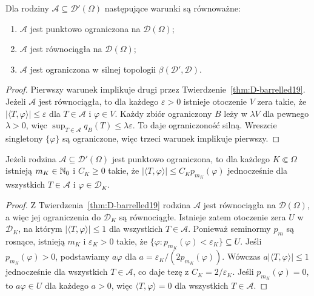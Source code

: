 \begin{wniosek}
\label{cor:bounded-distributions19}
Dla rodziny $\mathcal A\subseteq\mathcal D'(\Omega)$
następujące warunki są równoważne:
\begin{enumerate}
\item $\mathcal A$ jest punktowo ograniczona na $\mathcal D(\Omega)$;
\item $\mathcal A$ jest równociągła na $\mathcal D(\Omega)$;
\item $\mathcal A$ jest ograniczona w silnej topologii
$\beta(\mathcal D',\mathcal D)$.
\end{enumerate}
\end{wniosek}
\begin{proof}
Pierwszy warunek implikuje drugi przez
Twierdzenie~\ref{thm:D-barrelled19}. Jeżeli
$\mathcal A$ jest równociągła, to dla każdego
$\varepsilon>0$ istnieje otoczenie $V$ zera takie,
że $|\langle T,\varphi\rangle|\le\varepsilon$ dla
$T\in\mathcal A$ i $\varphi\in V$.
Każdy zbiór ograniczony $B$ leży w $\lambda V$
dla pewnego $\lambda>0$, więc
$\sup_{T\in\mathcal A}q_B(T)\le\lambda\varepsilon$.
To daje ograniczoność silną. Wreszcie singletony
$\{\varphi\}$ są ograniczone, więc trzeci warunek
implikuje pierwszy.
\end{proof}

\begin{wniosek}
\label{cor:uniform-order19}
Jeżeli rodzina $\mathcal A\subseteq\mathcal D'(\Omega)$ jest
punktowo ograniczona, to dla każdego $K\Subset\Omega$
istnieją $m_K\in\mathbb N_0$ i $C_K\ge0$ takie, że
$|\langle T,\varphi\rangle|\le C_Kp_{m_K}(\varphi)$
jednocześnie dla wszystkich $T\in\mathcal A$
i $\varphi\in\mathcal D_K$.
\end{wniosek}
\begin{proof}
Z Twierdzenia~\ref{thm:D-barrelled19} rodzina $\mathcal A$
jest równociągła na $\mathcal D(\Omega)$, a więc jej
ograniczenia do $\mathcal D_K$ są równociągłe.
Istnieje zatem otoczenie zera $U$ w $\mathcal D_K$,
na którym $|\langle T,\varphi\rangle|\le1$ dla wszystkich
$T\in\mathcal A$. Ponieważ seminormy $p_m$ są rosnące,
istnieją $m_K$ i $\varepsilon_K>0$ takie, że
$\{\varphi:p_{m_K}(\varphi)<\varepsilon_K\}\subseteq U$.
Jeśli $p_{m_K}(\varphi)>0$, podstawiamy
$a\varphi$ dla $a=\varepsilon_K/(2p_{m_K}(\varphi))$.
Wówczas $a|\langle T,\varphi\rangle|\le1$
jednocześnie dla wszystkich $T\in\mathcal A$,
co daje tezę z $C_K=2/\varepsilon_K$.
Jeśli $p_{m_K}(\varphi)=0$, to $a\varphi\in U$
dla każdego $a>0$, więc $\langle T,\varphi\rangle=0$
dla wszystkich $T\in\mathcal A$.
\end{proof}

